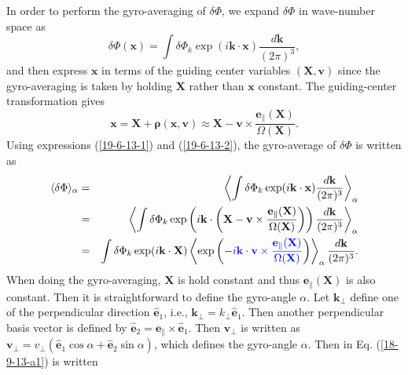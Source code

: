 \documentclass{llncs}
\newcommand{\tmcolor}[2]{{\color{#1}{#2}}}
\newcommand{\tmmathbf}[1]{\ensuremath{\boldsymbol{#1}}}
\begin{document}
In order to perform the gyro-averaging of $\delta \Phi$, we expand $\delta
\Phi$ in wave-number space as
\begin{equation}
  \label{19-6-13-1} \delta \Phi (\mathbf{x}) = \int \delta \Phi_k \exp
  (i\mathbf{k} \cdot \mathbf{x}) \frac{d\mathbf{k}}{(2 \pi)^3},
\end{equation}
and then express $\mathbf{x}$ in terms of the guiding center variables
$(\mathbf{X}, \mathbf{v})$ since the gyro-averaging is taken by holding
$\mathbf{X}$ rather than $\mathbf{x}$ constant. The guiding-center
transformation gives
\begin{equation}
  \label{19-6-13-2} \mathbf{x}=\mathbf{X}+\tmmathbf{\rho} (\mathbf{x},
  \mathbf{v}) \approx \mathbf{X}-\mathbf{v} \times
  \frac{\mathbf{e}_{\parallel} (\mathbf{X})}{\Omega (\mathbf{X})} .
\end{equation}
Using expressions (\ref{19-6-13-1}) and (\ref{19-6-13-2}), the gyro-average of
$\delta \Phi$ is written as
\begin{eqnarray}
  \langle \delta \Phi \rangle_{\alpha} & = & \left\langle \int \delta \Phi_k
  \exp (i\mathbf{k} \cdot \mathbf{x}) \frac{d\mathbf{k}}{(2 \pi)^3}
  \right\rangle_{\alpha} \nonumber\\
  & = & \left\langle \int \delta \Phi_k \exp \left( i\mathbf{k} \cdot \left(
  \mathbf{X}-\mathbf{v} \times \frac{\mathbf{e}_{\parallel}
  (\mathbf{X})}{\Omega (\mathbf{X})} \right) \right) \frac{d\mathbf{k}}{(2
  \pi)^3} \right\rangle_{\alpha} \nonumber\\
  & = & \int \delta \Phi_k \exp (i\mathbf{k} \cdot \mathbf{X}) \left\langle
  \exp \left( \tmcolor{blue}{- i\mathbf{k} \cdot \mathbf{v} \times
  \frac{\mathbf{e}_{\parallel} (\mathbf{X})}{\Omega (\mathbf{X})}} \right)
  \right\rangle_{\alpha} \frac{d\mathbf{k}}{(2 \pi)^3} .  \label{18-9-13-a1}
\end{eqnarray}
When doing the gyro-averaging, $\mathbf{X}$ is hold constant and thus
$\mathbf{e}_{\parallel} (\mathbf{X})$ is also constant. Then it is
straightforward to define the gyro-angle $\alpha$. Let $\mathbf{k}_{\perp}$
define one of the perpendicular direction $\hat{\mathbf{e}}_1$, i.e.,
$\mathbf{k}_{\perp} = k_{\perp} \hat{\mathbf{e}}_1$. Then another
perpendicular basis vector is defined by $\hat{\mathbf{e}}_2
=\mathbf{e}_{\parallel} \times \hat{\mathbf{e}}_1$. Then $\mathbf{v}_{\perp}$
is written as $\mathbf{v}_{\perp} = v_{\perp} (\hat{\mathbf{e}}_1 \cos \alpha
+ \hat{\mathbf{e}}_2 \sin \alpha)$, which defines the gyro-angle $\alpha$.
Then \tmcolor{blue}{the blue expression} in Eq. (\ref{18-9-13-a1}) is written
\end{document}
